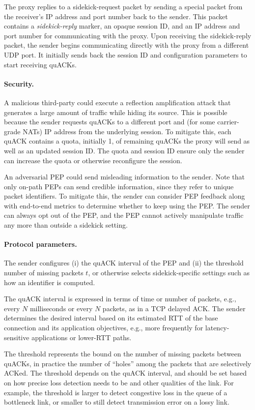 The proxy replies to a sidekick-request packet by sending a special packet
from the receiver's IP address and port number back to the sender.
This packet contains a \emph{sidekick-reply} marker, an opaque session ID, and an
IP address and port number for communicating with the proxy.  Upon
receiving the sidekick-reply packet, the sender begins communicating
directly with the proxy from a different UDP port.  It initially sends
back the session ID and configuration parameters to start receiving
quACKs.

\paragraph{Security.}
A malicious third-party could execute a reflection amplification attack that
generates a large amount of traffic while hiding its source. This is
possible because the sender requests quACKs to a different port and (for some
carrier-grade NATs) IP address from the underlying session. To mitigate this,
each quACK contains a quota, initially 1, of remaining quACKs the proxy will
send as well as an updated session ID\@.
The quota and session ID ensure only the sender can increase the quota or
otherwise reconfigure the session.

An adversarial PEP could send misleading information to the sender. Note that
only on-path PEPs can send credible information, since they refer to unique
packet identifiers.
To mitigate this, the sender can consider PEP feedback along with
end-to-end metrics to determine whether to keep using the PEP. The sender can
always opt out of the PEP, and the PEP cannot actively manipulate traffic any
more than outside a sidekick setting.

\paragraph{Protocol parameters.}
The sender configures (i) the quACK interval of the PEP and (ii) the threshold
number of missing packets $t$, or otherwise selects sidekick-specific settings
such as how an identifier is computed.

The quACK interval is expressed in terms of time or number of packets,
 e.g., every $N$ milliseconds or every $N$ packets, as in a TCP delayed ACK.
The sender determines the desired interval based on its estimated
RTT of the base connection and its application objectives, e.g.,
more frequently for latency-sensitive applications or lower-RTT paths.
%

The threshold represents the bound on the number of missing packets
between quACKs, in practice the number of ``holes'' among the packets that are
selectively ACKed. The threshold depends on the quACK interval, and
should be set based on how precise loss detection needs to be and
other qualities of the link.
For example, the threshold is larger to detect congestive loss in the queue of a
bottleneck link, or smaller to still detect transmission error on a lossy link.

